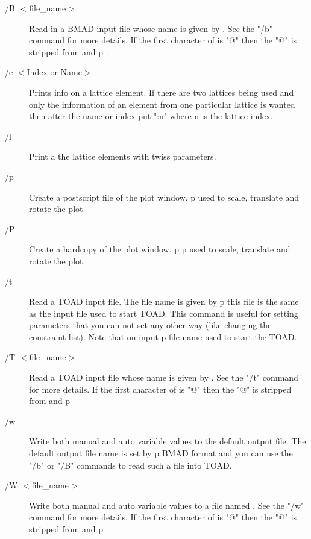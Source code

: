 \begin{description}
\item[/B $<$file\_name$>$]   
Read in a BMAD input file whose name is given by . See the
"/b" command for more details. If the first character of  is
"@" then the "@" is stripped from   and p%
.

\item[/e $<$Index or Name$>$]
Prints info on a lattice element. If there are two lattices being used
and only the information of an element from one particular lattice is wanted
then after the name or index put ":n" where n is the lattice index.

\item[/l]
Print a the lattice elements with twiss parameters.

\item[/p]
Create a postscript file of the plot window.
p%
used to scale, translate and rotate the plot.

\item[/P]
Create a hardcopy of the plot window.
p%
p%
used to scale, translate and rotate the plot.

\item[/t]
Read a TOAD input file. The file name is given by p%
this file is the same as the input file used to start TOAD. This command is
useful for setting parameters that you can not set any other way (like
changing the constraint list). Note that on input p%
file name used to start the TOAD.

\item[/T $<$file\_name$>$]
Read a TOAD input file whose name is given by .
See the "/t" command for more details.
If the first character of  is "@" then the "@" is stripped
from   and p%

\item[/w]
Write both manual and auto variable values to the default output file. 
The default output file name is set by p%
BMAD format and you can use the "/b" or "/B" commands to read such a file into
TOAD.

\item[/W $<$file\_name$>$]
Write both manual and auto variable values to a file named
. See the "/w" command for more details.
If the first character of  is "@" then the "@" is stripped
from   and p%


\end{description}
